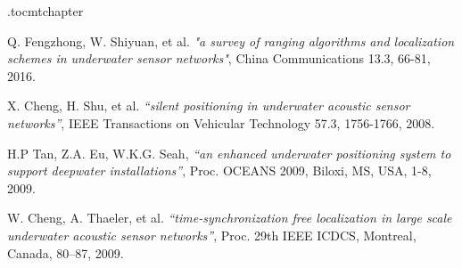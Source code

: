 \documentclass[12pt,a4paper,fleqn]{report}
\begin{document}
\etocdepthtag.toc{mtchapter}

\begin{thebibliography}{10}
		Q. Fengzhong, W. Shiyuan, et al.
		{\em "a survey of ranging algorithms and localization schemes in underwater sensor networks"},
		 China Communications 13.3,
		 66-81,
		 2016.
	
		X. Cheng, H. Shu, et al.
		{\em “silent positioning in underwater acoustic sensor networks”},
		IEEE Transactions on Vehicular Technology 57.3,
		1756-1766,
		2008.
	
		H.P Tan, Z.A. Eu, W.K.G. Seah,
		{\em “an enhanced underwater positioning system to support deepwater installations”},
		Proc. OCEANS 2009, Biloxi, MS, USA,
		1-8,
		2009.
	
		W. Cheng, A. Thaeler, et al.
		{\em “time-synchronization free localization in large scale underwater acoustic sensor networks”},
		Proc. 29th IEEE ICDCS, Montreal, Canada,
		80–87,
		2009.
	
%	
\end{thebibliography}
\end{document}
